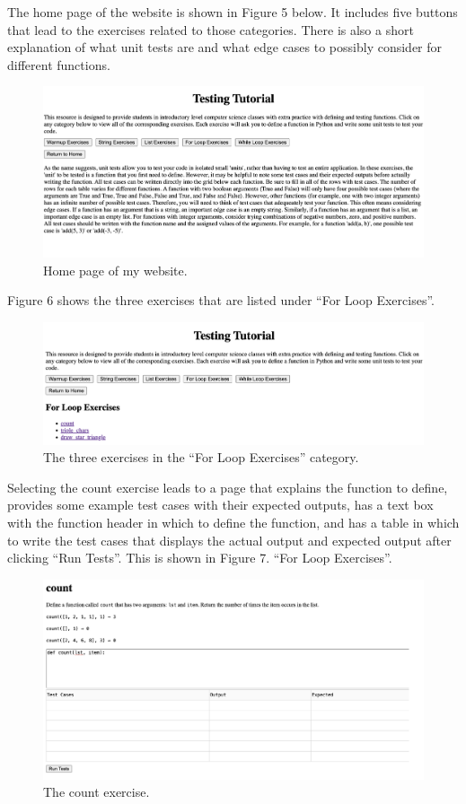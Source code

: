 \documentclass[10pt,twocolumn]{article}
\begin{document}
The home page of the website is shown in Figure 5 below. It includes five buttons that lead to the exercises related to those categories. There is also a short explanation of what unit tests are and what edge cases to possibly consider for different functions.
\begin{figure}
    \centering
    \includegraphics[width=.95\linewidth]{Home.png}
    \caption{
        Home page of my website.
    }
    \label{fig:first-page}
\end{figure}

Figure 6 shows the three exercises that are listed under \enquote{For Loop Exercises}.
\begin{figure}
    \centering
    \includegraphics[width=.95\linewidth]{ForLoop.png}
    \caption{
        The three exercises in the \enquote{For Loop Exercises} category.
    }
    \label{fig:first-page}
\end{figure}

Selecting the count exercise leads to a page that explains the function to define, provides some example test cases with their expected outputs, has a text box with the function header in which to define the function, and has a table in which to write the test cases that displays the actual output and expected output after clicking “Run Tests”. This is shown in Figure 7.
\enquote{For Loop Exercises}.
\begin{figure}
    \centering
    \includegraphics[width=.95\linewidth]{count.png}
    \caption{
        The count exercise.
    }
    \label{fig:first-page}
\end{figure}
\end{document}

